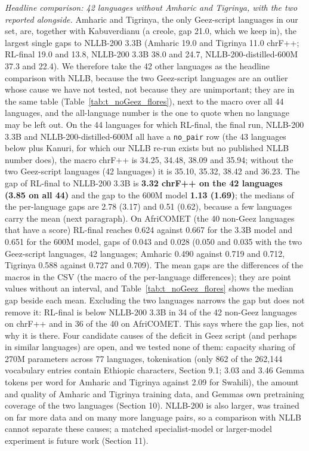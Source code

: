 \emph{Headline comparison: 42 languages without Amharic and Tigrinya, with the two reported alongside.} Amharic and Tigrinya, the only Ge\textquotesingle ez-script languages in our set, are, together with Kabuverdianu (a creole, gap 21.0, which we keep in), the largest single gaps to NLLB-200 3.3B (Amharic 19.0 and Tigrinya 11.0 chrF++; RL-final 19.0 and 13.8, NLLB-200 3.3B 38.0 and 24.7, NLLB-200-distilled-600M 37.3 and 22.4). We therefore take the 42 other languages as the headline comparison with NLLB, because the two Ge\textquotesingle ez-script languages are an outlier whose cause we have not tested, not because they are unimportant; they are in the same table (Table~\ref{tab:t_noGeez_flores}), next to the macro over all 44 languages, and the all-language number is the one to quote when no language may be left out. On the 44 languages for which RL-final, the final run, NLLB-200 3.3B and NLLB-200-distilled-600M all have a \texttt{no\_pair} row (the 43 languages below plus Kanuri, for which our NLLB re-run exists but no published NLLB number does), the macro chrF++ is 34.25, 34.48, 38.09 and 35.94; without the two Ge\textquotesingle ez-script languages (42 languages) it is 35.10, 35.32, 38.42 and 36.23. The gap of RL-final to NLLB-200 3.3B is \textbf{3.32 chrF++ on the 42 languages (3.85 on all 44)} and the gap to the 600M model \textbf{1.13 (1.69)}; the medians of the per-language gaps are 2.78 (3.17) and 0.51 (0.62), because a few languages carry the mean (next paragraph). On AfriCOMET (the 40 non-Ge\textquotesingle ez languages that have a score) RL-final reaches 0.624 against 0.667 for the 3.3B model and 0.651 for the 600M model, gaps of 0.043 and 0.028 (0.050 and 0.035 with the two Ge\textquotesingle ez-script languages, 42 languages; Amharic 0.490 against 0.719 and 0.712, Tigrinya 0.588 against 0.727 and 0.709). The mean gaps are the differences of the macros in the CSV (the macro of the per-language differences); they are point values without an interval, and Table~\ref{tab:t_noGeez_flores} shows the median gap beside each mean. Excluding the two languages narrows the gap but does not remove it: RL-final is below NLLB-200 3.3B in 34 of the 42 non-Ge\textquotesingle ez languages on chrF++ and in 36 of the 40 on AfriCOMET. This says where the gap lies, not why it is there. Four candidate causes of the deficit in Ge\textquotesingle ez script (and perhaps in similar languages) are open, and we tested none of them: capacity sharing of 270M parameters across 77 languages, tokenisation (only 862 of the 262,144 vocabulary entries contain Ethiopic characters, Section 9.1; 3.03 and 3.46 Gemma tokens per word for Amharic and Tigrinya against 2.09 for Swahili), the amount and quality of Amharic and Tigrinya training data, and Gemma\textquotesingle s own pretraining coverage of the two languages (Section 10). NLLB-200 is also larger, was trained on far more data and on many more language pairs, so a comparison with NLLB cannot separate these causes; a matched specialist-model or larger-model experiment is future work (Section 11).

